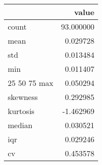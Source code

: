 \begin{tabular}{lr}
\toprule
 & value \\
\midrule
count & 93.000000 \\
mean & 0.029728 \\
std & 0.013484 \\
min & 0.011407 \\
25%
50%
75%
max & 0.050294 \\
skewness & 0.292985 \\
kurtosis & -1.462969 \\
median & 0.030521 \\
iqr & 0.029246 \\
cv & 0.453578 \\
\bottomrule
\end{tabular}
